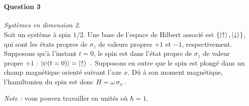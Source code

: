 \newpage
\
\newpage
\ 
\newpage


\paragraph{Question 3} \textit{Systèmes en dimension 2.} \\

Soit un système à spin $1/2$. Une base de l'espace de Hilbert associé est $\lbrace\ket{\uparrow}, \ket{\downarrow}\rbrace$, qui sont les états propres de $\sigma_z$ de valeurs propres $+1$ et $-1$, respectivement. \\

Supposons qu'à l'instant $t=0$, le spin est dans l'état propre de $\sigma_z$ de valeur propre $+1$ : $\ket{\psi(t=0)} = \ket{\uparrow} \ .$ Supposons en outre que le spin est plongé dans un champ magnétique orienté suivant l'axe $x$. Dû à son moment magnétique, l'hamiltonien du spin est donc $H=\omega \, \sigma_x\ .$

\textit{Note :} vous pouvez travailler en unités où $\hbar =1$. \\

